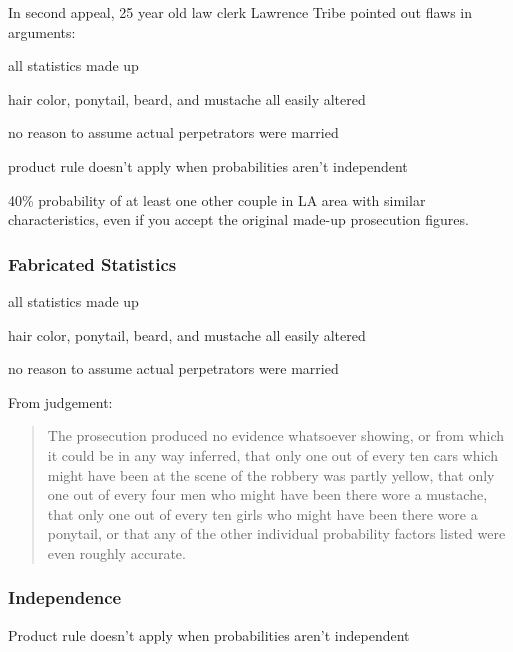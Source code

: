 \documentclass[letterpaper, landscape]{exam}
\begin{document}
  In second appeal, 25 year old law clerk Lawrence Tribe pointed out flaws in
  arguments:

  \begin{itemize*}
    \item all statistics made up
    \item hair color, ponytail, beard, and mustache all easily altered
    \item no reason to assume actual perpetrators were married 
    \item product rule doesn't apply when probabilities aren't independent

    \item 40\% probability of at least one other couple in LA area with similar
      characteristics, even if you accept the original made-up prosecution
      figures. 

  \end{itemize*}

  \subsubsection{Fabricated Statistics}
  \begin{itemize*}
    \item all statistics made up
    \item hair color, ponytail, beard, and mustache all easily altered
    \item no reason to assume actual perpetrators were married 
  \end{itemize*}

  From judgement:
  \begin{quote}
    \begin{em}
      The prosecution produced no evidence whatsoever showing, or from which it
      could be in any way inferred, that only one out of every ten cars which
      might have been at the scene of the robbery was partly yellow, that only
      one out of every four men who might have been there wore a mustache, that
      only one out of every ten girls who might have been there wore a
      ponytail, or that any of the other individual probability factors listed
      were even roughly accurate.
    \end{em}
  \end{quote}

  \subsubsection{Independence}
  Product rule doesn't apply when probabilities aren't independent
\end{document}
